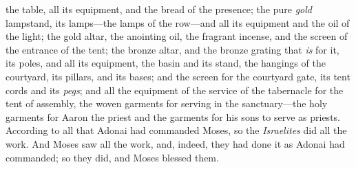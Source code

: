 \begin{biblechapter}
\verse the table, all its equipment, and the bread of the presence;
\verse the pure \textit{gold} lampstand, its lamps—the lamps of the row—and all its equipment and the oil of the light;
\verse the gold altar, the anointing oil, the fragrant incense, and the screen of the entrance of the tent;
\verse the bronze altar, and the bronze grating that \textit{is} for it, its poles, and all its equipment, the basin and its stand,
\verse the hangings of the courtyard, its pillars, and its bases; and the screen for the courtyard gate, its tent cords and its \textit{pegs}; and all the equipment of the service of the tabernacle for the tent of assembly,
\verse the woven garments for serving in the sanctuary—the holy garments for Aaron the priest and the garments for his sons to serve as priests.
\verse According to all that Adonai had commanded Moses, so the \textit{Israelites} did all the work.
\verse And Moses saw all the work, and, indeed, they had done it as Adonai had commanded; so they did, and Moses blessed them.
\end{biblechapter}

